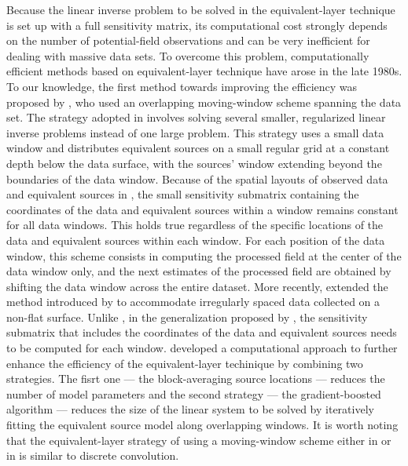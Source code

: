 Because the linear inverse problem to be solved in the equivalent-layer technique is set up  with a full sensitivity matrix, its computational cost strongly depends on the number of 
potential-field observations and can be very inefficient for dealing with massive data sets. 
To overcome this problem, computationally efficient methods based on equivalent-layer 
technique have arose in the late 1980s. 
To our knowledge, the first method towards improving the efficiency  was proposed by 
\cite{leao-silva1989}, 
who used an overlapping moving-window scheme spanning the data set. 
The strategy adopted in \cite{leao-silva1989} involves solving several smaller, regularized linear inverse problems instead of one large problem. 
This strategy uses a small data window and distributes equivalent sources 
on a small regular grid at a constant depth below the data surface, with the sources' window extending beyond the boundaries of the data window.
Because of the spatial layouts of observed data and equivalent sources in \cite{leao-silva1989}, the small sensitivity submatrix containing the coordinates of the data and equivalent sources within a window remains constant for all data windows. This holds true regardless  of the specific locations of the data and equivalent sources within each window.
For each position of the data window, this scheme consists in computing the processed field 
at the center of the data window only, and the next estimates of the processed field are 
obtained by shifting the data window across the entire dataset. 
More recently, \cite{soler-uieda2021} extended the method introduced by \cite{leao-silva1989} to accommodate irregularly spaced data collected on a non-flat surface.
Unlike  \cite{leao-silva1989}, in the generalization proposed by \cite{soler-uieda2021}, the sensitivity submatrix that includes the coordinates of the data and equivalent sources needs to be computed for each window.
\cite{soler-uieda2021}  developed a computational approach to further enhance the efficiency of the equivalent-layer techinique by combining two strategies. 
The fisrt one --- the block-averaging source locations --- reduces the number of model parameters and the second strategy --- the gradient-boosted algorithm --- reduces the size of the linear system to be solved by iteratively fitting the equivalent source model  along overlapping windows. 
It is worth noting that the equivalent-layer strategy of using a moving-window scheme either in \cite{leao-silva1989} or in \cite{soler-uieda2021} is similar to discrete convolution.

